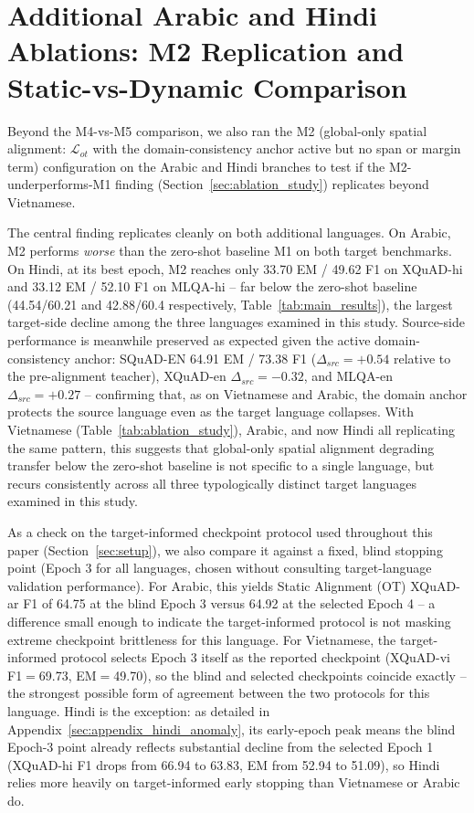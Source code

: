 \documentclass[11pt]{article}
\begin{document}
\section{Additional Arabic and Hindi Ablations: M2 Replication and Static-vs-Dynamic Comparison}
\label{sec:appendix_arabic_hindi_margin}
Beyond the M4-vs-M5 comparison, we also ran the M2 (global-only spatial alignment: $\mathcal{L}_{ot}$ with the domain-consistency anchor active but no span or margin term) configuration on the Arabic and Hindi branches to test if the M2-underperforms-M1 finding (Section~\ref{sec:ablation_study}) replicates beyond Vietnamese.

The central finding replicates cleanly on both additional languages. On Arabic, M2 performs \emph{worse} than the zero-shot baseline M1 on both target benchmarks. On Hindi, at its best epoch, M2 reaches only 33.70 EM / 49.62 F1 on XQuAD-hi and 33.12 EM / 52.10 F1 on MLQA-hi -- far below the zero-shot baseline (44.54/60.21 and 42.88/60.4 respectively, Table~\ref{tab:main_results}), the largest target-side decline among the three languages examined in this study. Source-side performance is meanwhile preserved as expected given the active domain-consistency anchor: SQuAD-EN 64.91 EM / 73.38 F1 ($\Delta_{src}=+0.54$ relative to the pre-alignment teacher), XQuAD-en $\Delta_{src}=-0.32$, and MLQA-en $\Delta_{src}=+0.27$ -- confirming that, as on Vietnamese and Arabic, the domain anchor protects the source language even as the target language collapses. With Vietnamese (Table~\ref{tab:ablation_study}), Arabic, and now Hindi all replicating the same pattern, this suggests that global-only spatial alignment degrading transfer below the zero-shot baseline is not specific to a single language, but recurs consistently across all three typologically distinct target languages examined in this study.

As a check on the target-informed checkpoint protocol used throughout this paper (Section~\ref{sec:setup}), we also compare it against a fixed, blind stopping point (Epoch 3 for all languages, chosen without consulting target-language validation performance). For Arabic, this yields Static Alignment (OT) XQuAD-ar F1 of 64.75 at the blind Epoch 3 versus 64.92 at the selected Epoch 4 -- a difference small enough to indicate the target-informed protocol is not masking extreme checkpoint brittleness for this language. For Vietnamese, the target-informed protocol selects Epoch 3 itself as the reported checkpoint (XQuAD-vi F1$=$69.73, EM$=$49.70), so the blind and selected checkpoints coincide exactly -- the strongest possible form of agreement between the two protocols for this language. Hindi is the exception: as detailed in Appendix~\ref{sec:appendix_hindi_anomaly}, its early-epoch peak means the blind Epoch-3 point already reflects substantial decline from the selected Epoch 1 (XQuAD-hi F1 drops from 66.94 to 63.83, EM from 52.94 to 51.09), so Hindi relies more heavily on target-informed early stopping than Vietnamese or Arabic do.
\end{document}
